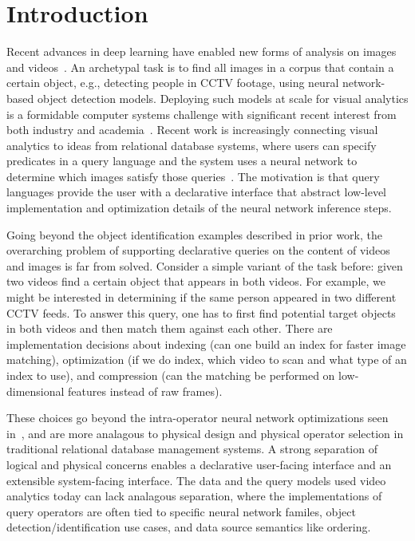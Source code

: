 \section{Introduction}\label{intro}\sloppy
Recent advances in deep learning have enabled new forms of analysis on images and videos~\cite{lecun2015deep}. 
An archetypal task is to find all images in a corpus that contain a certain object, e.g., detecting people in CCTV footage, using neural network-based object detection models.  
Deploying such models at scale for visual analytics is a formidable computer systems challenge with significant recent interest from both industry and academia~\cite{kang2017noscope, anderson2018predicate, kang2018blazeit, chetlur2014cudnn}. 
Recent work is increasingly connecting visual analytics to ideas from relational database systems, where users can specify predicates in a query language and the system uses a neural network to determine which images satisfy those queries~\cite{kang2018blazeit,wu2018querying}.
The motivation is that query languages provide the user with a declarative interface that abstract low-level implementation and optimization details of the neural network inference steps.

Going beyond the object identification examples described in prior work, the overarching problem of supporting declarative queries on the content of videos and images is far from solved. 
Consider a simple variant of the task before: given two videos find a certain object that appears in both videos. For example, we might be interested in determining if the same person appeared in two different CCTV feeds. To answer this query, one has to first find potential target objects in both videos and then match them against each other. There are implementation decisions about indexing (can one build an index for faster image matching), optimization (if we do index, which video to scan and what type of an index to use), and compression (can the matching be performed on low-dimensional features instead of raw frames).

These choices go beyond the intra-operator neural network optimizations seen in~\cite{kang2017noscope, anderson2018predicate, kang2018blazeit}, and are more analagous to physical design and physical operator selection in traditional relational database management systems. A strong separation of logical and physical concerns enables a declarative user-facing interface and an extensible system-facing interface. The data and the query models used video analytics today can lack analagous separation, where the implementations of query operators are often tied to specific neural network familes, object detection/identification use cases, and data source semantics like ordering.

